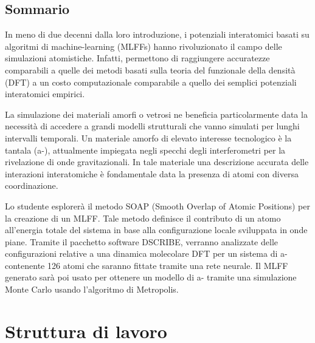 \documentclass[a4paper,11pt,openany]{book}
\begin{document}
    
\frontmatter %
    
    
    
\tableofcontents %
    
\mainmatter %

	\section*{Sommario}
	
	In meno di due decenni dalla loro introduzione, i potenziali interatomici basati su algoritmi di machine-learning (MLFFs)  hanno rivoluzionato il campo delle simulazioni atomistiche. Infatti, permettono di raggiungere accuratezze comparabili a quelle dei metodi basati sulla teoria del funzionale della densità (DFT) a un costo computazionale comparabile a quello dei semplici  potenziali interatomici empirici.
	
	La simulazione dei materiali amorfi o vetrosi ne  beneficia particolarmente data la necessità di accedere a grandi modelli strutturali che vanno simulati per lunghi intervalli temporali. Un materiale amorfo di elevato interesse tecnologico è la tantala (a-), attualmente impiegata negli specchi degli interferometri per la rivelazione di onde gravitazionali. In tale materiale una descrizione accurata delle interazioni interatomiche è fondamentale data la presenza di atomi con diversa coordinazione. 
	
	Lo studente esplorerà il metodo SOAP (Smooth Overlap of Atomic Positions) per la creazione di un MLFF.  Tale metodo definisce il contributo di un atomo all'energia totale del sistema in base alla configurazione locale sviluppata in onde piane.  Tramite il pacchetto software DSCRIBE, verranno analizzate delle configurazioni relative a una dinamica molecolare DFT per un sistema di  a-  contenente 126 atomi che saranno fittate tramite una rete neurale. Il MLFF generato sarà poi usato per ottenere un modello di a- tramite una simulazione Monte Carlo usando l'algoritmo di Metropolis.

    \chapter{Struttura di lavoro}
    
    
\end{document}

